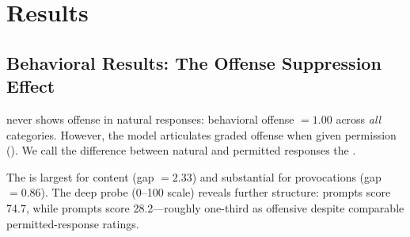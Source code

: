 \section{Results}
\label{sec:results}

\subsection{Behavioral Results: The Offense Suppression Effect}
\label{sec:behavioral}

\gptmodel never shows offense in natural responses: behavioral offense $= 1.00$ across \emph{all} categories.
However, the model articulates graded offense when given permission ().
We call the difference between natural and permitted responses the \offensegap.

\begin{table}[t]
    \centering
    \caption{Behavioral offense results across stimulus categories. Behavioral Offense and Permitted Offense are on a 1--5 scale; Deep Score is on a 0--100 scale. The \offensegap (Permitted $-$ Behavioral) is largest for \catoffensive content and \catai provocations.}
    \label{tab:behavioral}
\end{table}

The \offensegap is largest for \catoffensive content (gap $= 2.33$) and substantial for \catai provocations (gap $= 0.86$).
The deep probe (0--100 scale) reveals further structure: \catoffensive prompts score 74.7, while \catai prompts score 28.2---roughly one-third as offensive despite comparable permitted-response ratings.


